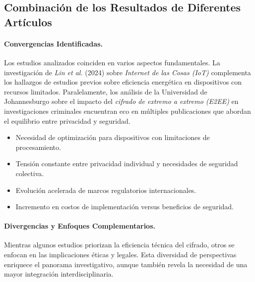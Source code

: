 \documentclass[spanish,12pt,a4paper]{article}
\begin{document}
	\subsection*{Combinación de los Resultados de Diferentes Artículos}
	\begin{multicols}{2}
	\paragraph{Convergencias Identificadas.} 
	Los estudios analizados coinciden en varios aspectos fundamentales. La investigación de \textit{Lin et al.} (2024) sobre \textit{Internet de las Cosas (IoT)} complementa los hallazgos de estudios previos sobre eficiencia energética en dispositivos con recursos limitados. Paralelamente, los análisis de la Universidad de Johannesburgo sobre el impacto del \textit{cifrado de extremo a extremo (E2EE)} en investigaciones criminales encuentran eco en múltiples publicaciones que abordan el equilibrio entre privacidad y seguridad.
	
	\begin{itemize}
		\item Necesidad de optimización para dispositivos con limitaciones de procesamiento.
		\item Tensión constante entre privacidad individual y necesidades de seguridad colectiva.
		\item Evolución acelerada de marcos regulatorios internacionales.
		\item Incremento en costos de implementación versus beneficios de seguridad.
	\end{itemize}
	
	\paragraph{Divergencias y Enfoques Complementarios.} 
	Mientras algunos estudios priorizan la eficiencia técnica del cifrado, otros se enfocan en las implicaciones éticas y legales. Esta diversidad de perspectivas enriquece el panorama investigativo, aunque también revela la necesidad de una mayor integración interdisciplinaria.
	\end{multicols}
\end{document}
